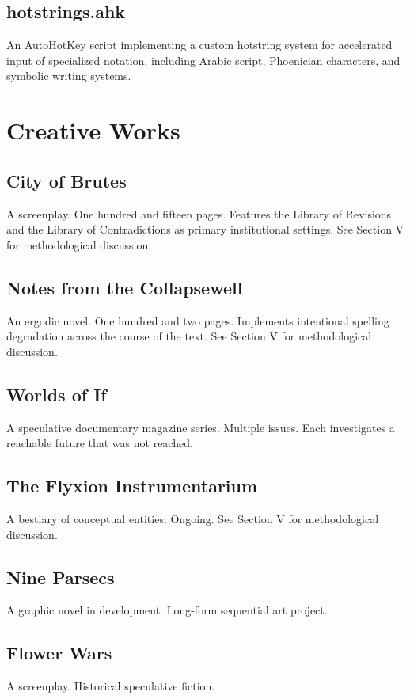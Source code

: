 \documentclass[12pt, openany]{book}
\begin{document}
\subsection{hotstrings.ahk} An AutoHotKey script implementing a custom
hotstring system for accelerated input of specialized notation, including
Arabic script, Phoenician characters, and symbolic writing systems.

\section{Creative Works}

\subsection{City of Brutes} A screenplay. One hundred and fifteen pages.
Features the Library of Revisions and the Library of Contradictions as
primary institutional settings. See Section V for methodological discussion.

\subsection{Notes from the Collapsewell} An ergodic novel. One hundred
and two pages. Implements intentional spelling degradation across the
course of the text. See Section V for methodological discussion.

\subsection{Worlds of If} A speculative documentary magazine series.
Multiple issues. Each investigates a reachable future that was not reached.

\subsection{The Flyxion Instrumentarium} A bestiary of conceptual entities.
Ongoing. See Section V for methodological discussion.

\subsection{Nine Parsecs} A graphic novel in development. Long-form
sequential art project.

\subsection{Flower Wars} A screenplay. Historical speculative fiction.
\end{document}
